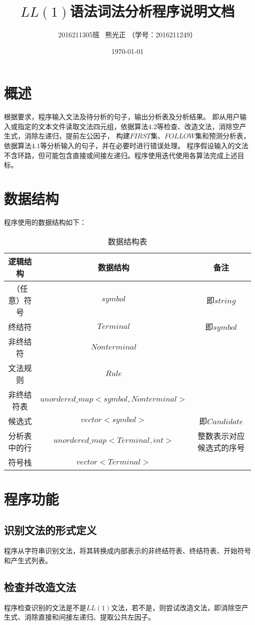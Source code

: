 \documentclass[UTF8]{ctexart}
\title{$LL(1)$语法词法分析程序说明文档}
\author{2016211305班 \ 熊光正 （学号：2016211249）}
\date{\today}
\begin{document}
\lstset{numbers=left,frame=single}
\maketitle
\tableofcontents
\clearpage
\section{概述}
根据要求，程序输入文法及待分析的句子，输出分析表及分析结果。
即从用户输入或指定的文本文件读取文法四元组，依据算法$4.2$等检查、改造文法，消除空产生式，消除左递归，提前左公因子，
构建$FIRST$集、$FOLLOW$集和预测分析表，依据算法$4.1$等分析输入的句子，并在必要时进行错误处理。
程序假设输入的文法不含环路，但可能包含直接或间接左递归。程序使用迭代使用各算法完成上述目标。
\section{数据结构}
程序使用的数据结构如下：
\begin{table}[!h]
    \centering
    \caption{数据结构表}
    \begin{tabular}{|c|c|c|}
    \hline
    逻辑结构 & 数据结构 & 备注 \\ \hline
    （任意）符号  &  $symbol$ & 即$string$  \\ \hline
    终结符  &  $Terminal$ & 即$symbol$  \\ \hline
    非终结符  & $Nonterminal$  &   \\ \hline
    文法规则 & $Rule$  &   \\ \hline
    非终结符表 & $unordered\_map<symbol, Nonterminal>$  &   \\ \hline
    候选式 & $vector<symbol>$  & 即$Candidate$  \\ \hline
    分析表中的行 & $unordered\_map<Terminal, int>$  & 整数表示对应候选式的序号  \\ \hline
    符号栈 & $vector<Terminal>$  &   \\ \hline
    \end{tabular}
    \end{table}
\section{程序功能}
\subsection{识别文法的形式定义}
程序从字符串识别文法，将其转换成内部表示的非终结符表、终结符表、开始符号和产生式列表。
\subsection{检查并改造文法}
程序检查识别的文法是不是$LL(1)$文法，若不是，则尝试改造文法，即消除空产生式、消除直接和间接左递归、提取公共左因子。
\end{document}
